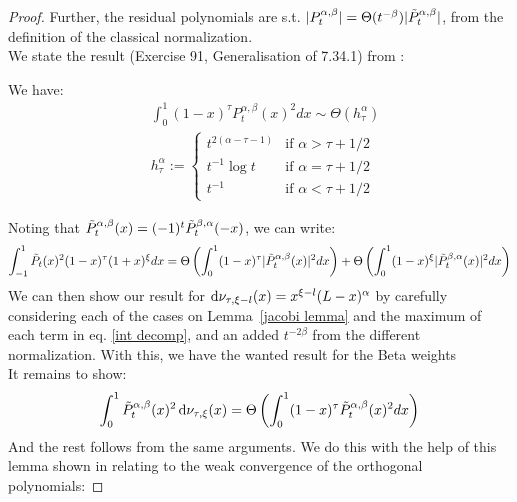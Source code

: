\documentclass{article}
\begin{document}
\begin{proof}
Further, the residual polynomials  are s.t. $|P^{\alpha,\beta}_t|=\Theta(t^{-\beta})|\Tilde{P}^{\alpha,\beta}_t|$, from the definition of the classical normalization.\\
We state the result (Exercise 91, Generalisation of 7.34.1) from \cite{szego1975orthogonal}:
\begin{lemma}
We have:
\begin{align}
    &\int_0^1(1-x)^\tau P_t^{\alpha,\beta}(x)^2dx \sim\Theta( h_{\tau}^\alpha) \\
    &h_{\tau}^\alpha:=
\left\{
	\begin{array}{ll}
		t^{2(\alpha-\tau-1)}  & \mbox{if } \alpha>\tau+1/2 \\
		t^{-1}\log t   & \mbox{if } \alpha=\tau+1/2 \\
		t^{-1}   & \mbox{if } \alpha<\tau+1/2
	\end{array}
\right.
\end{align}
 \label{jacobi lemma}
\end{lemma}
Noting that $\Tilde{P}^{\alpha,\beta}_t(x)=(-1)^t\Tilde{P}_t^{\beta,\alpha}(-x)$, we can write:
\begin{equation}
    \int_{-1}^1\Tilde{P}_t(x)^2(1-x)^\tau(1+x)^\xi dx = \Theta\left(\int_0^1(1-x)^\tau|\Tilde{P}_t^{\alpha,\beta}(x)|^2dx\right) +\Theta\left(\int_0^1(1-x)^\xi|\Tilde{P}_t^{\beta,\alpha}(x)|^2dx\right) \label{int decomp}
\end{equation}
We can then show our result for $\mathop{}\!\mathrm{d}\nu_{\tau,\xi-l}(x)=x^{\xi-l}(L-x)^\alpha$ by carefully considering each of the cases on Lemma~\ref{jacobi lemma} and the maximum of each term in eq. \ref{int decomp}, and an added $t^{-2\beta}$ from the different normalization. With this, we have the wanted result for the Beta weights \\
It remains to show:
\begin{equation}
    \int_0^1 \Tilde{P}_t^{\alpha,\beta}(x)^2\mathop{}\!\mathrm{d}\nu_{\tau,\xi}(x)= \Theta\left(\int_0^1(1-x)^\tau\Tilde{P}_t^{\alpha,\beta}(x)^2dx \right)
\end{equation}
And the rest follows from the same arguments. We do this with the help of this lemma shown in \cite{van1995weak} relating to the weak convergence of the orthogonal polynomials:


\end{proof}
\end{document}

